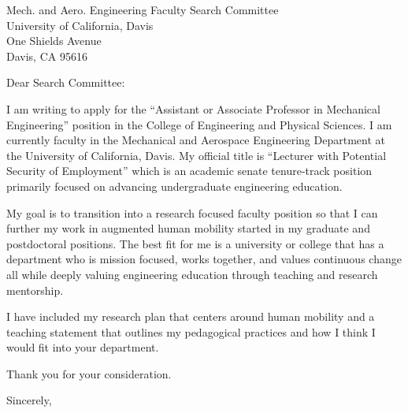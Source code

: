 \documentclass{letter}
\date{April 16, 2019}
\begin{document}
\begin{letter}{
  Mech. and Aero. Engineering Faculty Search Committee \\
  University of California, Davis \\
  One Shields Avenue \\
  Davis, CA 95616}
\opening{Dear Search Committee:}

I am writing to apply for the ``Assistant or Associate Professor in Mechanical
Engineering'' position in the College of Engineering and Physical Sciences. I
am currently faculty in the Mechanical and Aerospace Engineering Department at
the University of California, Davis. My official title is ``Lecturer with
Potential Security of Employment'' which is an academic senate tenure-track
position primarily focused on advancing undergraduate engineering education.

My goal is to transition into a research focused faculty position so that I can
further my work in augmented human mobility started in my graduate and
postdoctoral positions. The best fit for me is a university or college that has
a department who is mission focused, works together, and values continuous
change all while deeply valuing engineering education through teaching and
research mentorship.

I have included my research plan that centers around human mobility and a
teaching statement that outlines my pedagogical practices and how I think I
would fit into your department.

Thank you for your consideration.

\closing{Sincerely,}

\end{letter}
\end{document}
